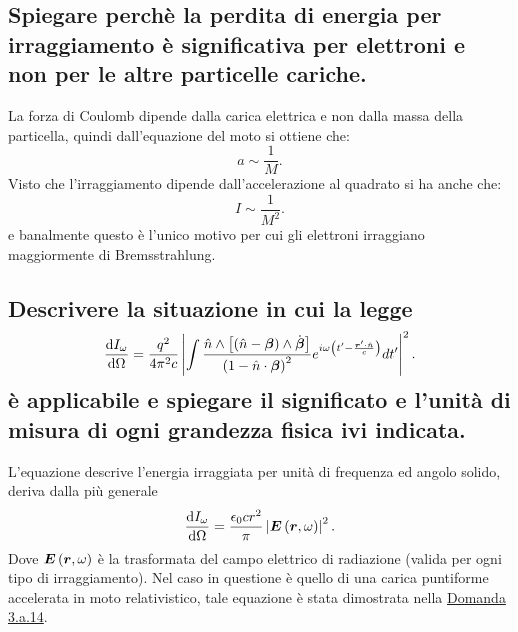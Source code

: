 \subsection[]{Spiegare perchè la perdita di energia per irraggiamento è significativa per elettroni e non per le altre particelle cariche.
}\label{sec:4.a.10}
La forza di Coulomb dipende dalla carica elettrica e non dalla massa della particella, quindi dall'equazione del moto si ottiene che:
\[
	a \sim \frac{1}{M}
.\]
Visto che l'irraggiamento dipende dall'accelerazione al quadrato si ha anche che:
\[
	I\sim \frac{1}{M^2}
.\] 
e banalmente questo è l'unico motivo per cui gli elettroni irraggiano maggiormente di Bremsstrahlung.

\subsection[]{Descrivere la situazione in cui la legge
\[
	\frac{\mbox{d}I_{\omega}}{\mbox{d}\Omega}=
	\frac{q^2}{4\pi^2c}\left|\int\frac{\hat{n}\wedge\left[\left(\hat{n}-\boldsymbol{\beta}\right)\wedge\dot{\boldsymbol{\beta}}\right]}{\left(1-\hat{n}\cdot\boldsymbol{\beta}\right)^2}
	e^{i\omega\left(t'-\frac{\boldsymbol{r}'\cdot\hat{n}}{c}\right)}dt'\right|^2 
.\] 
è applicabile e spiegare il significato e l'unità di misura di ogni grandezza fisica ivi
indicata.
}\label{sec:4.a.11}
L'equazione descrive l'energia irraggiata per unità di frequenza ed angolo solido, deriva dalla più generale 
\[
	\frac{\mbox{d} I_{\omega}}{\mbox{d} \Omega} = \frac{\epsilon_0 c r^2}{\pi} \left| \boldsymbol{E}\left( \boldsymbol{r}, \omega \right)  \right| ^2
.\] 
Dove $\boldsymbol{E}\left( \boldsymbol{r}, \omega \right)$ è la trasformata del campo elettrico di radiazione (valida per ogni tipo di irraggiamento).
Nel caso in questione è quello di una carica puntiforme accelerata in moto relativistico, tale equazione è stata dimostrata nella \hyperref[sec:3.a.14]{Domanda 3.a.14}.
